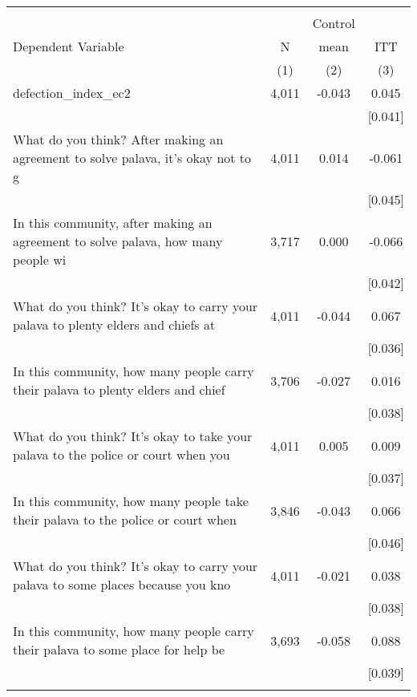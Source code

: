\begin{tabular}{lccc}
\hline \noalign{\smallskip} &  &  & \\
 &  & Control & \\
Dependent Variable & N & mean & ITT\\
 & (1) & (2) & (3)\\
\noalign{\smallskip}\hline \noalign{\smallskip}defection_index_ec2 & 4,011 & -0.043 & 0.045\\
 &  &  & [0.041]\\
What do you think? After making an agreement to solve palava, it's okay not to g & 4,011 & 0.014 & -0.061\\
 &  &  & [0.045]\\
In this community, after making an agreement to solve palava, how many people wi & 3,717 & 0.000 & -0.066\\
 &  &  & [0.042]\\
What do you think? It's okay to carry your palava to plenty elders and chiefs at & 4,011 & -0.044 & 0.067\\
 &  &  & [0.036]\\
In this community, how many people carry their palava to plenty elders and chief & 3,706 & -0.027 & 0.016\\
 &  &  & [0.038]\\
What do you think? It's okay to take your palava to the police or court when you & 4,011 & 0.005 & 0.009\\
 &  &  & [0.037]\\
In this community, how many people take their palava to the police or court when & 3,846 & -0.043 & 0.066\\
 &  &  & [0.046]\\
What do you think? It's okay to carry your palava to some places because you kno & 4,011 & -0.021 & 0.038\\
 &  &  & [0.038]\\
In this community, how many  people carry their palava to some place for help be & 3,693 & -0.058 & 0.088\\
 &  &  & [0.039]\\
\noalign{\smallskip}\hline\end{tabular}
